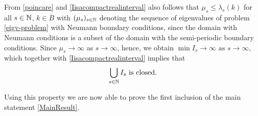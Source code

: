 From \eqref{poincare} and \eqref{Iisacompactrealinterval} also follows that $\mu_{s} \leq \lambda_{s}(k)$ for all $s \in \mathbb{N}$, $k \in \overline{B}$ with $(\mu_{s})_{s \in \mathbb{N}}$ denoting the sequence of eigenvalues of problem \eqref{eigv-problem} with Neumann boundary conditions, since the domain with Neumann conditions is a subset of the domain with the semi-periodic boundary conditions. Since $\mu_{s} \rightarrow \infty$ as $s \rightarrow \infty$, hence, we obtain $\min I_{s} \rightarrow \infty \text{ as } s \rightarrow \infty$, which together with \eqref{Iisacompactrealinterval} implies that %
	\begin{equation}
		\bigcup_{s \in \mathbb{N}} I_{s} \text{ is closed.} \label{UIclosed}
	\end{equation}

Using this property we are now able to prove the first inclusion of the main statement \eqref{MainResult}.	

